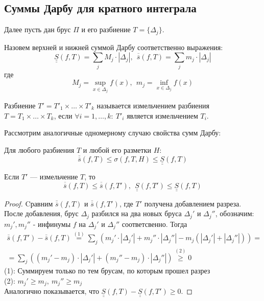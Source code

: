 \subsection{Суммы Дарбу для кратного интеграла}
Далее пусть дан брус $\Pi$ и его разбиение $T=\{\Delta_j\}$.
\begin{definition}
    Назовем верхней и нижней суммой Дарбу соответственно выражения:
    \[\underline{\underline{S}}(f,T)=\sum\limits_{j} M_j\cdot |\Delta_j|, \ \ \overline{\overline{s}}(f,T)=\sum\limits_{j} m_j\cdot |\Delta_j|\]
    где
    \[M_j=\sup\limits_{x\in \Delta_j}f(x),\ \ m_j=\inf\limits_{x\in \Delta_j}f(x)\]
\end{definition}
\begin{definition}
    Разбиение $T'=T'_1\times\dots\times T'_k$  называется измельчением разбиения $T=T_1\times\dots\times T_k$, если $\forall i=1,\dots,k:\ T'_i$ является измельчением $T_i$. 
\end{definition}
\noindent Рассмотрим аналогичные одномерному случаю свойства сумм Дарбу:
\begin{statement}
    Для любого разбиения $T$ и любой его разметки $H$:
    \[\overline{\overline{s}}(f,T)\leq \sigma(f, T, H)\leq \underline{\underline{S}}(f, T)\]
\end{statement}
\begin{statement}
    Если $T'$ --- измельчение $T$, то 
        \[\overline{\overline{s}}(f,T)\leq \overline{\overline{s}}(f, T'),\ \ \underline{\underline{S}}(f,T')\leq \underline{\underline{S}}(f,T)\]
\end{statement}
\begin{proof}
    Cравним $\overline{\overline{s}}(f, T)$ и $\overline{\overline{s}}(f, T')$, где $T'$ получена добавлением разреза. После добавления, брус $\Delta_j$ разбился на два новых бруса $\Delta_j'$ и $\Delta_j''$, обозначим: $m_j', m_j''$ - инфинумы $f$ на $\Delta_j'$ и $\Delta_j''$ соответсвенно. Тогда 
    \begin{multline*}
        \overline{\overline{s}}(f,T')-\overline{\overline{s}}(f,T)\overset{(1)}{=}\sum\limits_{j}(m_j'\cdot |\Delta_j'|+m_j''\cdot |\Delta_j''|-m_j(|\Delta_j'|+|\Delta_j''|))=\\
        =\sum\limits_{j}((m_j'-m_j)\cdot |\Delta_j'|+(m_j''-m_j)\cdot |\Delta_j''|)\overset{(2)}{\geq} 0
    \end{multline*}
    (1): Суммируем только по тем брусам, по которым прошел разрез\\
    (2): $m_j'\geq m_j,\ m_j''\geq m_j$\\
    Аналогично показывается, что $\underline{\underline{S}}(f,T)-\underline{\underline{S}}(f,T')\geq 0$.
\end{proof}

